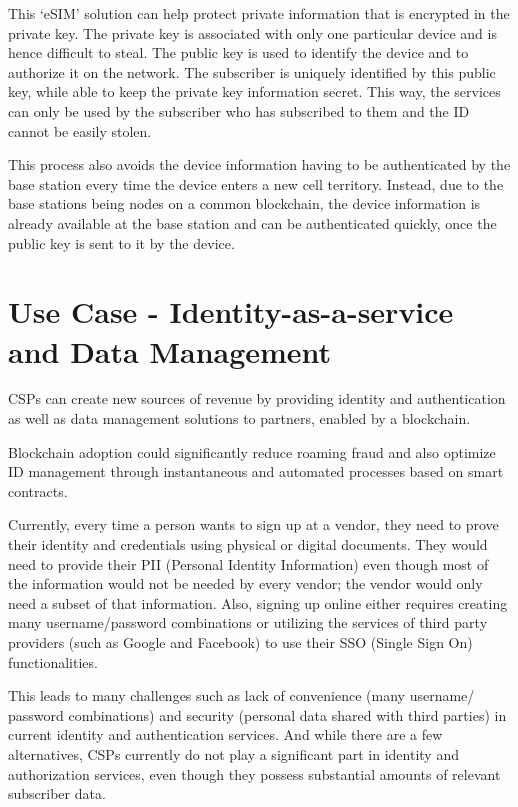 \documentclass[12pt]{article}
\begin{document}
This ‘eSIM’ solution can help protect private
information that is encrypted in the private
key. The private key is associated with only
one particular device and is hence difficult
to steal. The public key is used to identify
the device and to authorize it on the network. The subscriber is uniquely identified
by this public key, while able to keep the private key information secret. This way, the
services can only be used by the subscriber
who has subscribed to them and the ID
cannot be easily stolen.

This process also avoids the device information having to be authenticated by the
base station every time the device enters a
new cell territory. Instead, due to the base
stations being nodes on a common blockchain, the device information is already
available at the base station and can be
authenticated quickly, once the public key
is sent to it by the device.

\section{Use Case - Identity-as-a-service and Data Management}

CSPs can create new sources of revenue by
providing identity and authentication as well
as data management solutions to partners,
enabled by a blockchain.

\leftboxbegin
Blockchain adoption
could significantly reduce
roaming fraud and also
optimize ID management
through instantaneous
and automated processes
based on smart contracts.
\leftboxend

Currently, every time a person wants to
sign up at a vendor, they need to prove
their identity and credentials using physical
or digital documents. They would need to
provide their PII (Personal Identity Information)
even though most of the information
would not be needed by every vendor; the
vendor would only need a subset of that
information. Also, signing up online either
requires creating many username/password
combinations or utilizing the services of
third party providers (such as Google and
Facebook) to use their SSO (Single Sign On)
functionalities.

This leads to many challenges such as lack
of convenience (many username/ password
combinations) and security (personal data
shared with third parties) in current identity
and authentication services. And while
there are a few alternatives, CSPs currently
do not play a significant part in identity and
authorization services, even though they
possess substantial amounts of relevant
subscriber data.
\end{document}
